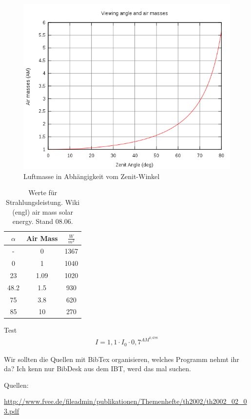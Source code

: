 \documentclass[fontsize=10pt,paper=a4,bibliography=totoc]{scrartcl}
\begin{document}
\begin{figure}[htb]
	\centering
	\includegraphics[width=\textwidth]{images/Airmass.png}
	\caption{Luftmasse in Abhängigkeit vom Zenit-Winkel}
	\label{pic:AirMass}
\end{figure}

\begin{table}
\centering
	\caption{Werte für Strahlungsleistung. Wiki (engl) air mass solar energy. Stand 08.06.}
	\label{tab:airmass}
\begin{tabular}{|c|c|c|}
	\hline
	$\alpha$ & Air Mass & $\frac{W}{m^2}$\\
	\hline
	- & 0 & 1367\\
	\hline
	0 & 1 & 1040\\
	\hline
	23 & 1.09 & 1020\\
	\hline
	48.2 & 1.5 & 930\\
	\hline
	75 & 3.8 & 620\\
	\hline
	85 & 10 & 270\\
	\hline
\end{tabular}
\end{table}
Test
\begin{align*}
	I=1,1\cdot I_0 \cdot 0,7^{AM^{0,678}}
	\label{eqn:Intensity}
\end{align*}

Wir sollten die Quellen mit BibTex organisieren, welches Programm nehmt ihr da? Ich kenn nur BibDesk aus dem IBT, werd das mal suchen.

Quellen:

\url{http://www.fvee.de/fileadmin/publikationen/Themenhefte/th2002/th2002_02_03.pdf}
\end{document}
